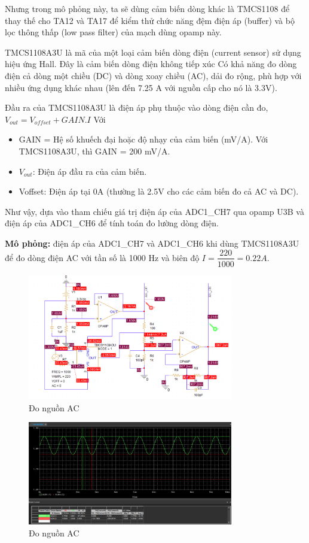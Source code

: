 Nhưng trong mô phỏng này, ta sẽ dùng cảm biến dòng khác là TMCS1108 để thay thế cho TA12 và TA17 để kiểm thử chức năng đệm điện áp (buffer) và bộ lọc thông thấp (low pass filter) của mạch dùng opamp này.

TMCS1108A3U là mã của một loại cảm biến dòng điện (current sensor) sử dụng hiệu ứng Hall. Đây là cảm biến dòng điện không tiếp xúc Có khả năng đo dòng điện cả dòng một chiều (DC) và dòng xoay chiều (AC), dải đo rộng, phù hợp với nhiều ứng dụng khác nhau (lên đến 7.25 A với nguồn cấp cho nó là 3.3V).

Đầu ra của TMCS1108A3U là điện áp phụ thuộc vào dòng điện cần đo, $V_{out} = V_{offset} + GAIN.I$
Với \begin{itemize}
    \item GAIN = Hệ số khuếch đại hoặc độ nhạy của cảm biến (mV/A). Với TMCS1108A3U, thì GAIN = 200 mV/A.
    \item $V_{out}$: Điện áp đầu ra của cảm biến.
    \item Voffset: Điện áp tại 0A (thường là 2.5V cho các cảm biến đo cả AC và DC).
\end{itemize}

Như vậy, dựa vào tham chiếu giá trị điện áp của ADC1\_CH7 qua opamp U3B và điện áp của ADC1\_CH6 để tính toán đo lường dòng điện.\

\textbf{Mô phỏng:} điện áp của ADC1\_CH7 và ADC1\_CH6 khi dùng TMCS1108A3U để đo dòng điện AC với tần số là 1000 Hz và biên độ $I = \dfrac{220}{1000} = 0.22 A$.
 \pagebreak
\begin{figure}[ht]
    \centering
    \includegraphics[width=0.8\textwidth]{graphics/section4/f21.png}
    \caption{Đo nguồn AC}
\end{figure}

\begin{figure}[ht]
    \centering
    \includegraphics[width=0.8\textwidth]{graphics/section4/f22.png}
    \caption{Đo nguồn AC}
\end{figure}
\pagebreak

